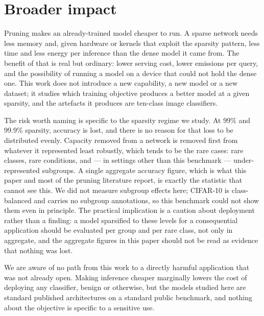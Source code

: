 %

\section{Broader impact}
\label{sec:stmt:impact}

Pruning makes an already-trained model cheaper to run. A sparse network needs
less memory and, given hardware or kernels that exploit the sparsity pattern,
less time and less energy per inference than the dense model it came from. The
benefit of that is real but ordinary: lower serving cost, lower emissions per
query, and the possibility of running a model on a device that could not hold
the dense one. This work does not introduce a new capability, a new model or a
new dataset; it studies which training objective produces a better model at a
given sparsity, and the artefacts it produces are ten-class image classifiers.

The risk worth naming is specific to the sparsity regime we study. At 99\% and
99.9\% sparsity, accuracy is lost, and there is no reason for that loss to be
distributed evenly. Capacity removed from a network is removed first from
whatever it represented least robustly, which tends to be the rare cases: rare
classes, rare conditions, and --- in settings other than this benchmark ---
under-represented subgroups. A single aggregate accuracy figure, which is what
this paper and most of the pruning literature report, is exactly the statistic
that cannot see this. We did not measure subgroup effects here; CIFAR-10 is
class-balanced and carries no subgroup annotations, so this benchmark could not
show them even in principle. The practical implication is a caution about
deployment rather than a finding: a model sparsified to these levels for a
consequential application should be evaluated per group and per rare class, not
only in aggregate, and the aggregate figures in this paper should not be read
as evidence that nothing was lost.

We are aware of no path from this work to a directly harmful application that
was not already open. Making inference cheaper marginally lowers the cost of
deploying any classifier, benign or otherwise, but the models studied here are
standard published architectures on a standard public benchmark, and nothing
about the objective is specific to a sensitive use.
